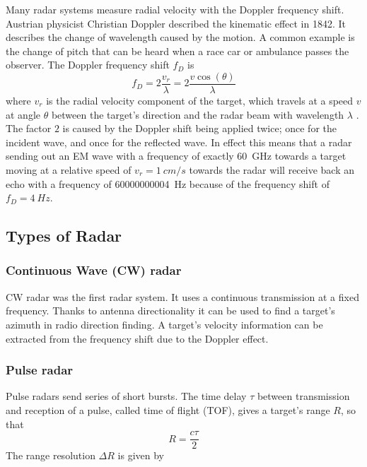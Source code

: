 Many radar systems measure radial velocity with the Doppler frequency
shift. Austrian physicist Christian Doppler described the kinematic
effect in 1842. It describes the change of wavelength caused by the
motion. A common example is the change of pitch that can be heard when a
race car or ambulance passes the observer. The Doppler frequency shift
\(f_D\) is
\begin{equation} \label{eq:doppler}
    f_D = 2 \frac{v_r}{\lambda} = 2 \frac{v \cos ( \theta )}{\lambda}
\end{equation}
where \(v_r\) is the radial velocity component of the target, which
travels at a speed \(v\) at angle \(\theta\) between the target's
direction and the radar beam with wavelength \(\lambda\)
\cite{Skolnik2008}. The factor \(2\) is caused by the Doppler shift
being applied twice; once for the incident wave, and once for the
reflected wave. In effect this means that a radar sending out an EM wave
with a frequency of exactly \SI{60}{GHz} towards a target moving at a
relative speed of \(v_r = \SI[per-mode=symbol]{1}{cm\per s}\) towards the radar will receive
back an echo with a frequency of \SI{60000000004}{Hz} because of the
frequency shift of \(f_D = \SI{4}{Hz}\).

\subsection{Types of Radar}\label{types-of-radar}

\subsubsection{Continuous Wave (CW) radar}\label{continuous-wave-cw-radar}

CW radar was the first radar system. It uses a continuous transmission
at a fixed frequency. Thanks to antenna directionality it can be used to
find a target's azimuth in radio direction finding. A target's velocity
information can be extracted from the frequency shift due to the Doppler
effect.

\subsubsection{Pulse radar}\label{pulse-radar}

Pulse radars send series of short bursts. The time delay \(\tau\)
between transmission and reception of a pulse, called time of flight
(TOF), gives a target's range \(R\), so that 
\begin{equation} \label{eq:tof}
	 R = \frac{c\tau}{2} 
\end{equation}
The range resolution \(\Delta R\) is given by

